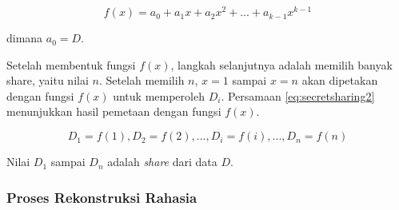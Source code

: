\begin{equation}
	f(x) = a_0 + a_1x + a_2x^2 + ... + a_{k-1}x^{k-1} \label{eq:secretsharing1}
\end{equation}

\begin{flushleft}
	dimana \begin{math}a_0 = D\end{math}.
\end{flushleft}

Setelah membentuk fungsi \begin{math}f(x)\end{math}, langkah selanjutnya adalah memilih banyak share, yaitu nilai \begin{math}n\end{math}. Setelah memilih \begin{math}n\end{math}, \begin{math}x=1\end{math} sampai \begin{math}x=n\end{math} akan dipetakan dengan fungsi \begin{math}f(x)\end{math} untuk memperoleh \begin{math}D_i\end{math}. Persamaan \ref{eq:secretsharing2} menunjukkan hasil pemetaan dengan fungsi \begin{math}f(x)\end{math}.

\begin{equation}
	D_1 = f(1), D_2 = f(2), ..., D_i = f(i), ..., D_n = f(n) \label{eq:secretsharing2}
\end{equation}

Nilai \begin{math}D_1\end{math} sampai \begin{math}D_n\end{math} adalah \textit{share} dari data \begin{math}D\end{math}.

\subsubsection{Proses Rekonstruksi Rahasia}

